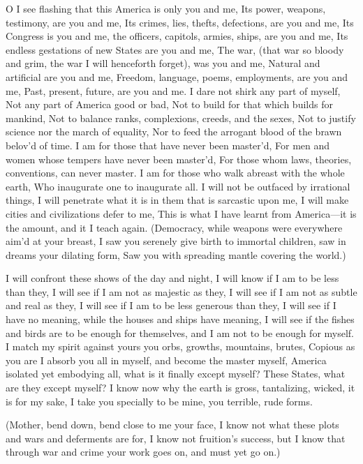 \documentclass[11pt]{book}
\newenvironment {poem} [1]
 {\titulus{#1}%
  \versus
  \Nstanza{0}%
  \numerus{1}}
 {\endversus}
\begin{document}
\begin{poem}{By Blue Ontario's Shore}
O I see flashing that this America is only you and me,
Its power, weapons, testimony, are you and me,
Its crimes, lies, thefts, defections, are you and me,
Its Congress is you and me, the officers, capitols, armies, ships, %
    are you and me,
Its endless gestations of new States are you and me,
The war, (that war so bloody and grim, the war I will henceforth %
    forget), was you and me,
Natural and artificial are you and me,
Freedom, language, poems, employments, are you and me,
Past, present, future, are you and me.
     \vacua
I dare not shirk any part of myself,
Not any part of America good or bad,
Not to build for that which builds for mankind,
Not to balance ranks, complexions, creeds, and the sexes,
Not to justify science nor the march of equality,
Nor to feed the arrogant blood of the brawn belov'd of time.
     \vacua
I am for those that have never been master'd,
For men and women whose tempers have never been master'd,
For those whom laws, theories, conventions, can never master.
     \vacua
I am for those who walk abreast with the whole earth,
Who inaugurate one to inaugurate all.
     \vacua
I will not be outfaced by irrational things,
I will penetrate what it is in them that is sarcastic upon me,
I will make cities and civilizations defer to me,
This is what I have learnt from America---it is the amount, and it I %
    teach again.
     \vacua
(Democracy, while weapons were everywhere aim'd at your breast,
I saw you serenely give birth to immortal children, saw in dreams %
    your dilating form,
Saw you with spreading mantle covering the world.)

\stropha %

I will confront these shows of the day and night,
I will know if I am to be less than they,
I will see if I am not as majestic as they,
I will see if I am not as subtle and real as they,
I will see if I am to be less generous than they,
I will see if I have no meaning, while the houses and ships have meaning,
I will see if the fishes and birds are to be enough for themselves, %
    and I am not to be enough for myself.
     \vacua
I match my spirit against yours you orbs, growths, mountains, brutes,
Copious as you are I absorb you all in myself, and become the master myself,
America isolated yet embodying all, what is it finally except myself?
These States, what are they except myself?
     \vacua
I know now why the earth is gross, tantalizing, wicked, it is for my sake,
I take you specially to be mine, you terrible, rude forms.
     \vacua

(Mother, bend down, bend close to me your face,
I know not what these plots and wars and deferments are for,
I know not fruition's success, but I know that through war and crime %
    your work goes on, and must yet go on.)


\end{poem}
\end{document}
